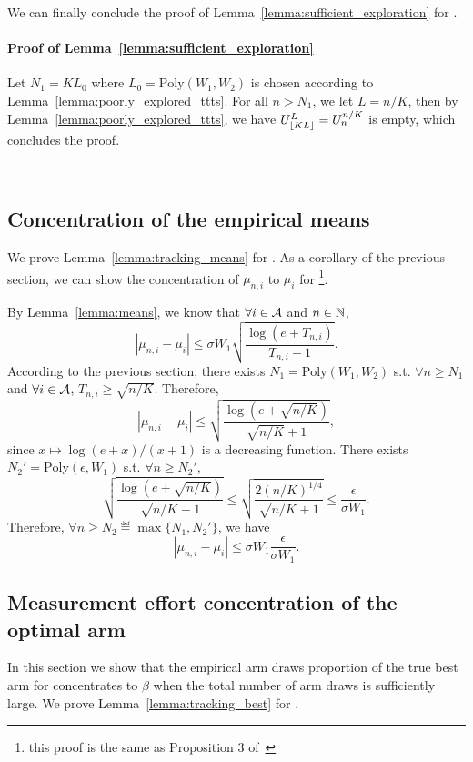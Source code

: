 We can finally conclude the proof of Lemma~\ref{lemma:sufficient_exploration} for \TTTS.

\paragraph{Proof of Lemma~\ref{lemma:sufficient_exploration}}
Let $N_1 = KL_0$ where $L_0 = \text{Poly}(W_1,W_2)$ is chosen according to Lemma~\ref{lemma:poorly_explored_ttts}. For all $n > N_1$, we let $L=n/K$, then by Lemma~\ref{lemma:poorly_explored_ttts}, we have $U_{\lfloor KL\rfloor}^L = U_n^{n/K}$ is empty, which concludes the proof.

\hfill\BlackBox\\[2mm]

\subsection{Concentration of the empirical means}\label{app:confidence_ttts.means}

We prove Lemma~\ref{lemma:tracking_means} for \TTTS. As a corollary of the previous section, we can show the concentration of $\mu_{n,i}$ to $\mu_i$ for \TTTS\footnote{this proof is the same as Proposition 3 of~\cite{qin2017ttei}}.

By Lemma~\ref{lemma:means}, we know that $\forall i\in\mathcal{A}$ and $n\in{\mathbb N}$,
\[
    |\mu_{n,i}-\mu_i| \leq \sigma W_1 \sqrt{\frac{\log(e+T_{n,i})}{T_{n,i}+1}}.
\]
According to the previous section, there exists $N_1 = \text{Poly}(W_1,W_2)$ s.t. $\forall n \geq N_1$ and $\forall i\in\mathcal{A}$, $T_{n,i} \geq \sqrt{n/K}$. Therefore,
\[
    |\mu_{n,i}-\mu_i| \leq \sqrt{\frac{\log(e+\sqrt{n/K})}{\sqrt{n/K}+1}},
\]
since $x \mapsto \log(e+x)/(x+1)$ is a decreasing function. There exists $N_2' = \text{Poly}(\epsilon,W_1)$ s.t. $\forall n \geq N_2'$,
\[
    \sqrt{\frac{\log(e+\sqrt{n/K})}{\sqrt{n/K}+1}} \leq \sqrt{\frac{2(n/K)^{1/4}}{\sqrt{n/K}+1}} \leq \frac{\epsilon}{\sigma W_1}.
\]
Therefore, $\forall n \geq N_2 \eqdef \max\{N_1,N_2'\}$, we have
\[
    |\mu_{n,i}-\mu_i| \leq \sigma W_1 \frac{\epsilon}{\sigma W_1}.
\]

\subsection{Measurement effort concentration of the optimal arm}\label{app:confidence_ttts.best_arm}

In this section we show that the empirical arm draws proportion of the true best arm for \TTTS concentrates to $\beta$ when the total number of arm draws is sufficiently large. We prove Lemma~\ref{lemma:tracking_best} for \TTTS.


